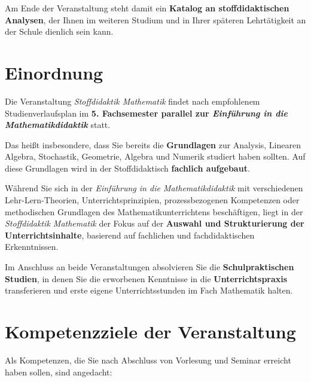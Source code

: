 \documentclass[
]{scrbook}
\theoremstyle{definition}
\theoremstyle{definition}
\theoremstyle{definition}
\theoremstyle{definition}
\theoremstyle{remark}
\begin{document}
Am Ende der Veranstaltung steht damit ein \textbf{Katalog an stoffdidaktischen Analysen}, der Ihnen im weiteren Studium und in Ihrer späteren Lehrtätigkeit an der Schule dienlich sein kann.

\hypertarget{einordnung}{%
\section*{Einordnung}\label{einordnung}}

Die Veranstaltung \emph{Stoffdidaktik Mathematik} findet nach empfohlenem Studienverlaufsplan im \textbf{5. Fachsemester parallel zur \emph{Einführung in die Mathematikdidaktik}} statt.

Das heißt insbesondere, dass Sie bereits die \textbf{Grundlagen} zur Analysis, Linearen Algebra, Stochastik, Geometrie, Algebra und Numerik studiert haben sollten. Auf diese Grundlagen wird in der Stoffdidaktisch \textbf{fachlich aufgebaut}.

Während Sie sich in der \emph{Einführung in die Mathematikdidaktik} mit verschiedenen Lehr-Lern-Theorien, Unterrichtsprinzipien, prozessbezogenen Kompetenzen oder methodischen Grundlagen des Mathematikunterrichtens beschäftigen, liegt in der \emph{Stoffdidaktik Mathematik} der Fokus auf der \textbf{Auswahl und Strukturierung der Unterrichtsinhalte}, basierend auf fachlichen und fachdidaktischen Erkenntnissen.

Im Anschluss an beide Veranstaltungen absolvieren Sie die \textbf{Schulpraktischen Studien}, in denen Sie die erworbenen Kenntnisse in die \textbf{Unterrichtspraxis} transferieren und erste eigene Unterrichtsstunden im Fach Mathematik halten.

\hypertarget{kompetenzziele-der-veranstaltung}{%
\section*{Kompetenzziele der Veranstaltung}\label{kompetenzziele-der-veranstaltung}}

Als Kompetenzen, die Sie nach Abschluss von Vorlesung und Seminar erreicht haben sollen, sind angedacht:
\end{document}
